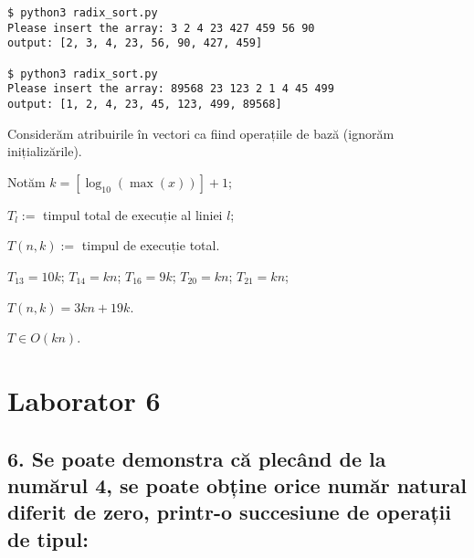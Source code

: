 \documentclass[11pt]{article}
\begin{document}
\begin{verbatim}
$ python3 radix_sort.py
Please insert the array: 3 2 4 23 427 459 56 90
output: [2, 3, 4, 23, 56, 90, 427, 459]

$ python3 radix_sort.py
Please insert the array: 89568 23 123 2 1 4 45 499
output: [1, 2, 4, 23, 45, 123, 499, 89568]
\end{verbatim}

Considerăm atribuirile în vectori ca fiind operațiile de bază (ignorăm inițializările).

Notăm $k = [\log_{10}(\max(x))] + 1$;

$T_l := $ timpul total de execuție al liniei $l$;

$T(n, k) :=$ timpul de execuție total.

\vspace{7pt}
$T_{13} = 10 k$;
$T_{14} = k n$;
$T_{16} = 9 k$;
$T_{20} = k n$;
$T_{21} = k n$;

$T(n, k) = 3kn + 19k$.

\vspace{7pt}
$T \in O(kn)$.

\section*{Laborator 6}
\label{sec:orgdedd097}
\subsection*{6. Se poate demonstra că plecând de la numărul 4, se poate obține orice număr natural diferit de zero, printr-o succesiune de operații de tipul:}
\label{sec:orgfd39e53}
\end{document}
